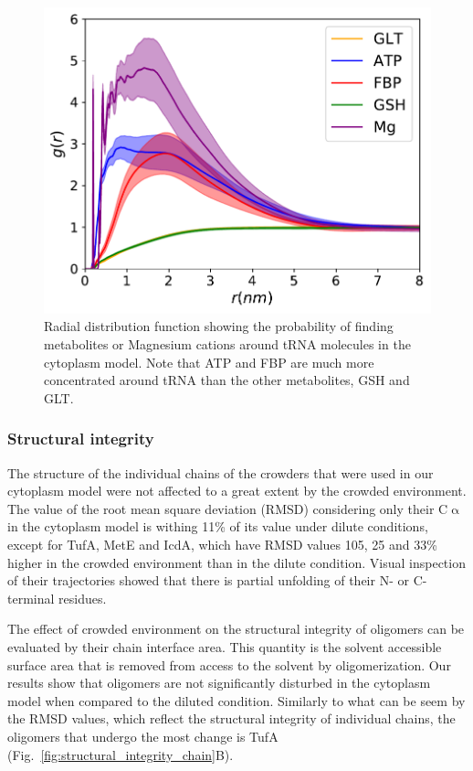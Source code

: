 \documentclass[journal=jacsat,manuscript=article]{achemso}
\begin{document}
\begin{figure}[H]
\includegraphics[scale=0.5]{rdf_RNA_metabolites.pdf}
\caption{Radial distribution function showing the probability of finding metabolites or Magnesium cations around tRNA molecules in the cytoplasm model. Note that ATP and FBP are much more concentrated around tRNA than the other metabolites, GSH and GLT.}
\label{fig:tRNA_aggregation}
\end{figure}





\subsubsection{Structural integrity}
The structure of the individual chains of the crowders that were used in our cytoplasm model were not affected to a great extent by the crowded environment. The value of the root mean square deviation (RMSD) considering only their C$\upalpha$ in the cytoplasm model is withing 11\% of its value under dilute conditions, except for TufA, MetE and IcdA, which have RMSD values 105, 25 and 33\% higher in the crowded environment than in the dilute condition. Visual inspection of their trajectories showed that there is partial unfolding of their N- or C-terminal residues. 

The effect of crowded environment on the structural integrity of oligomers can be evaluated by their chain interface area. This quantity is the solvent accessible surface area that is removed from access to the solvent by oligomerization. Our results show that oligomers are not significantly disturbed in the cytoplasm model when compared to the diluted condition. Similarly to what can be seem by the RMSD values, which reflect the structural integrity of individual chains, the oligomers that undergo the most change is TufA (Fig.~\ref{fig:structural_integrity_chain}B).
\end{document}

